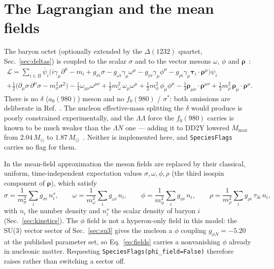 \documentclass[aps,prc,onecolumn,superscriptaddress,nofootinbib,10pt]{revtex4-2}
\begin{document}
\section{The Lagrangian and the mean fields}
\label{sec:lagrangian}

The baryon octet (optionally extended by the $\Delta(1232)$ quartet,
Sec.~\ref{sec:deltas}) is coupled to the scalar $\sigma$ and to the vector
mesons $\omega$, $\phi$ and $\boldsymbol{\rho}$~\cite{Frohaug2025}:
\begin{equation}
\begin{split}
  \mathcal{L} = \sum_{i \in B} \overline{\psi}_i \Big(
      i\gamma_\mu \partial^\mu - m_i + g_{\sigma i}\sigma
      - g_{\omega i}\gamma_\mu \omega^\mu
      - g_{\phi i}\gamma_\mu \phi^\mu
      - g_{\rho i}\gamma_\mu \boldsymbol{\tau}_i \cdot \boldsymbol{\rho}^\mu
    \Big)\psi_i \\
  + \tfrac{1}{2}\big(\partial_\mu\sigma\,\partial^\mu\sigma
      - m_\sigma^2\sigma^2\big)
  - \tfrac{1}{4}\omega_{\mu\nu}\omega^{\mu\nu}
  + \tfrac{1}{2}m_\omega^2\,\omega_\mu\omega^\mu
  + \tfrac{1}{2}m_\phi^2\,\phi_\mu\phi^\mu
  - \tfrac{1}{4}\boldsymbol{\rho}_{\mu\nu}\cdot\boldsymbol{\rho}^{\mu\nu}
  + \tfrac{1}{2}m_\rho^2\,\boldsymbol{\rho}_\mu\cdot\boldsymbol{\rho}^\mu .
\end{split}
\label{eq:lagrangian}
\end{equation}
There is no $\delta$ ($a_0(980)$) meson and no $f_0(980)$ / $\sigma^*$: both
omissions are deliberate in Ref.~\cite{Frohaug2025}. The nucleon effective-mass
splitting the $\delta$ would produce is poorly constrained experimentally, and
the $\Lambda\Lambda$ force the $f_0(980)$ carries is known to be much weaker
than the $\Lambda N$ one --- adding it to DD2Y lowered $M_{\max}$ from
$2.04\,M_\odot$ to $1.87\,M_\odot$~\cite{Marques2017}. Neither is implemented
here, and \texttt{SpeciesFlags} carries no flag for them.

In the mean-field approximation the meson fields are replaced by their
classical, uniform, time-independent expectation values
$\sigma, \omega, \phi, \rho$ (the third isospin component of
$\boldsymbol{\rho}$), which satisfy
\begin{equation}
  \sigma = \frac{1}{m_\sigma^2}\sum_i g_{\sigma i}\, n^s_i , \qquad
  \omega = \frac{1}{m_\omega^2}\sum_i g_{\omega i}\, n_i , \qquad
  \phi   = \frac{1}{m_\phi^2}\sum_i g_{\phi i}\, n_i , \qquad
  \rho   = \frac{1}{m_\rho^2}\sum_i g_{\rho i}\,\tau_{3i}\, n_i ,
  \label{eq:fields}
\end{equation}
with $n_i$ the number density and $n^s_i$ the scalar density of baryon $i$
(Sec.~\ref{sec:kinetics}). The $\phi$ field is not a hyperon-only field in this
model: the SU(3) vector sector of Sec.~\ref{sec:su3} gives the nucleon a
$\phi$ coupling $g_{\phi N} = -5.20$ at the published parameter set, so
Eq.~\eqref{eq:fields} carries a nonvanishing $\phi$ already in nucleonic
matter. Requesting \texttt{SpeciesFlags(phi\_field=False)} therefore raises
rather than switching a sector off.
\end{document}

